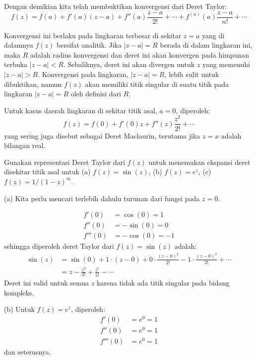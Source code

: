 Dengan demikian kita telah membuktikan konvergensi dari Deret Taylor:
\begin{equation*}
f(z)=f(a)+f'(a)(z-a)+f''(a)\frac{z-a}{2!}+\cdots+f^{(n)}(a)\frac{z-a}{n!}+\cdots
\end{equation*}

Konvergensi ini berlaku pada lingkaran terbesar di sekitar $z=a$
yang di dalamnya $f(z)$ bersifat analitik. Jika $\left|z-a\right|=R$
berada di dalam lingkaran ini, maka $R$ adalah radius konvergensi
dan deret ini akan konvergen pada himpunan terbuka $\left|z-a\right|<R$.
Sebaliknya, deret ini akan divergen untuk $z$ yang memenuhi $\left|z-a\right|>R$.
Konvergensi pada lingkaran, $\left|z-a\right|=R$, lebih sulit untuk
dibuktikan, namun $f(z)$ akan memiliki titik singular di suatu titik
pada lingkaran $\left|z-a\right|=R$ oleh definisi dari $R$.

Untuk kasus daerah lingkaran di sekitar titik asal, $a=0$, diperoleh:
\[
f(z)=f(0)+f'(0)z+f''(z)\frac{z^{2}}{2!}+\cdots
\]
yang sering juga disebut sebagai Deret Maclaurin, terutama jika $z=x$
adalah bilangan real.

\begin{contoh}
Gunakan representasi Deret Taylor dari $f(z)$ untuk menemukan ekspansi
deret disekitar titik asal untuk (a) $f(z)=\sin(z)$, (b) $f(z)=e^{z}$,
(c) $f(z)=1/(1-z)^{m}$.
\end{contoh}

(a) Kita perlu mencari terlebih dahulu turunan dari fungsi pada $z=0$.

\begin{align*}
f'(0) & =\cos(0)=1\\
f''(0) & =-\sin(0)=0\\
f'''(0) & =-\cos(0)=-1
\end{align*}
sehingga diperoleh deret Taylor dari $f(z)=\sin(z)$ adalah:
\begin{align*}
\sin(z) & =\sin(0)+1\cdot(z-0)+0\cdot\frac{(z-0)^{2}}{2!}-1\cdot\frac{(z-0)^{3}}{3!}+\cdots\\
 & =z-\frac{z^{3}}{3!}+\frac{z^{5}}{5!}-\cdots
\end{align*}
Deret ini valid untuk semua $z$ karena tidak ada titik singular pada
bidang kompleks.

(b) Untuk $f(z)=e^{z}$, diperoleh:
\begin{align*}
f'(0) & =e^{0}=1\\
f''(0) & =e^{0}=1\\
f'''(0) & =e^{0}=1
\end{align*}
dan seterusnya.

